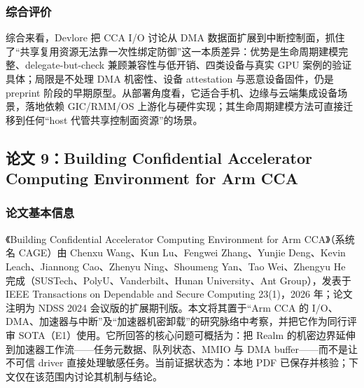 \documentclass[11pt]{ctexart}
\begin{document}
\subsubsection{综合评价}
综合来看，Devlore 把 CCA I/O 讨论从 DMA 数据面扩展到中断控制面，抓住了“共享复用资源无法靠一次性绑定防御”这一本质差异：优势是生命周期建模完整、delegate-but-check 兼顾兼容性与低开销、四类设备与真实 GPU 案例的验证具体；局限是不处理 DMA 机密性、设备 attestation 与恶意设备固件，仍是 preprint 阶段的早期原型。从部署角度看，它适合手机、边缘与云端集成设备场景，落地依赖 GIC/RMM/OS 上游化与硬件实现；其生命周期建模方法可直接迁移到任何“host 代管共享控制面资源”的场景。\par

\subsection{论文 9：Building Confidential Accelerator Computing Environment for Arm CCA}
\subsubsection{论文基本信息}
《Building Confidential Accelerator Computing Environment for Arm CCA》（系统名 CAGE）由 Chenxu Wang、Kun Lu、Fengwei Zhang、Yunjie Deng、Kevin Leach、Jiannong Cao、Zhenyu Ning、Shoumeng Yan、Tao Wei、Zhengyu He 完成（SUSTech、PolyU、Vanderbilt、Hunan University、Ant Group），发表于 IEEE Transactions on Dependable and Secure Computing 23(1)，2026 年；论文注明为 NDSS 2024 会议版的扩展期刊版。本文将其置于“Arm CCA 的 I/O、DMA、加速器与中断”及“加速器机密卸载”的研究脉络中考察，并把它作为同行评审 SOTA（E1）使用。它所回答的核心问题可概括为：把 Realm 的机密边界延伸到加速器工作流——任务元数据、队列状态、MMIO 与 DMA buffer——而不是让不可信 driver 直接处理敏感任务。当前证据状态为：本地 PDF 已保存并核验；下文仅在该范围内讨论其机制与结论。\cite{wang2026cage}\par
\end{document}
